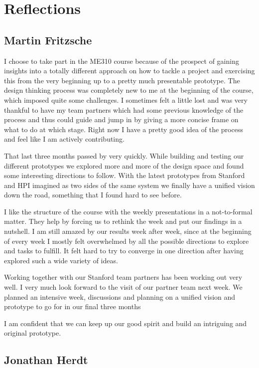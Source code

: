 \section{Reflections}
\subsection*{Martin Fritzsche}
I choose to take part in the ME310 course because of the prospect of gaining insights into a totally different approach on how to tackle a project and exercising this from the very beginning up to a pretty much presentable prototype. The design thinking process was completely new to me at the beginning of the course, which imposed quite some challenges. I sometimes felt a little lost and was very thankful to have my team partners which had some previous knowledge of the process and thus could guide and jump in by giving a more concise frame on what to do at which stage. Right now I have a pretty good idea of the process and feel like I am actively contributing.

That last three months passed by very quickly. While building and testing our different prototypes we explored more and more of the design space and found some interesting directions to follow. With the latest prototypes from Stanford and HPI imagined as two sides of the same system we finally have a unified vision down the road, something that I found hard to see before.

I like the structure of the course with the weekly presentations in a not-to-formal matter. They help by forcing us to rethink the week and put our findings in a nutshell. I am still amazed by our results week after week, since at the beginning of every week I mostly felt overwhelmed by all the possible directions to explore and tasks to fulfill. It felt hard to try to converge in one direction after having explored such a wide variety of ideas. 

Working together with our Stanford team partners has been working out very well. I very much look forward to the visit of our partner team next week. We planned an intensive week, discussions and planning on a unified vision and prototype to go for in our final three months 

I am confident that we can keep up our good spirit and build an intriguing and original prototype.
\subsection*{Jonathan Herdt}
